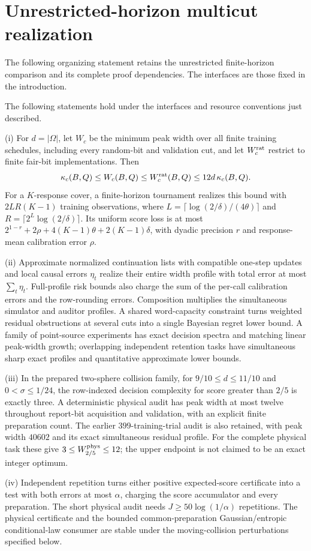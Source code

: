 \section{Unrestricted-horizon multicut realization}
The following organizing statement retains the unrestricted finite-horizon comparison and its complete proof dependencies. The interfaces are those fixed in the introduction.
\begin{theorem}
\label{thm:v21-main}
The following statements hold under the interfaces and resource
conventions just described.

\smallskip\noindent
\textup{(i)} For $d=|\Omega|$, let $W_c$ be the minimum peak width over
all finite training schedules, including every random-bit and validation
cut, and let $W_c^{\rm rat}$ restrict to finite fair-bit implementations.
Then
\[
 \kappa_c(B,Q)\le W_c(B,Q)\le W_c^{\rm rat}(B,Q)
                                \le12d\,\kappa_c(B,Q).
\]
For a $K$-response cover, a finite-horizon tournament realizes this bound
with $2LR(K-1)$ training observations, where
$L=\lceil\log(2/\delta)/(4\theta)\rceil$ and
$R=\lceil2^L\log(2/\delta)\rceil$. Its uniform score loss is at most
$2^{1-r}+2\rho+4(K-1)\theta+2(K-1)\delta$, with dyadic precision $r$
and response-mean calibration error $\rho$.

\smallskip\noindent
\textup{(ii)} Approximate normalized continuation lists with compatible
one-step updates and local causal errors $\eta_t$ realize their entire
width profile with total error at most $\sum_t\eta_t$. Full-profile
risk bounds also charge the sum of the per-call calibration errors and
the row-rounding errors. Composition multiplies the simultaneous
simulator and auditor profiles. A shared word-capacity constraint turns
weighted residual obstructions at several cuts into a single Bayesian
regret lower bound. A family of point-source experiments has exact
decision spectra and matching linear peak-width growth; overlapping
independent retention tasks have simultaneous sharp exact profiles and
quantitative approximate lower bounds.

\smallskip\noindent
\textup{(iii)} In the prepared two-sphere collision family, for
$9/10\le d\le11/10$ and $0<\sigma\le1/24$, the row-indexed decision
complexity for score greater than $2/5$ is exactly three. A deterministic
physical audit has peak width at most twelve throughout report-bit
acquisition and validation, with an explicit finite preparation count.
The earlier $399$-training-trial audit is also retained, with peak width
$40602$ and its exact simultaneous residual profile. For the complete
physical task these give $3\le W_{2/5}^{\rm phys}\le12$; the upper
endpoint is not claimed to be an exact integer optimum.

\smallskip\noindent
\textup{(iv)} Independent repetition turns either positive expected-score
certificate into a test with both errors at most $\alpha$, charging the
score accumulator and every preparation. The short physical audit needs
$J\ge50\log(1/\alpha)$ repetitions. The physical certificate and the
bounded common-preparation Gaussian/entropic conditional-law consumer
are stable under the moving-collision perturbations specified below.
\end{theorem}
